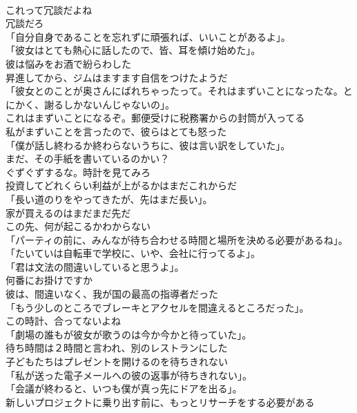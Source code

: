 \documentclass[8pt]{extreport}
\begin{document}
\begin{CJK}{UTF8}{min}
\\	これって冗談だよね 
\\	冗談だろ	
\\	「自分自身であることを忘れずに頑張れば、いいことがあるよ」。	
\\	「彼女はとても熱心に話したので、皆、耳を傾け始めた」。	
\\	彼は悩みをお酒で紛らわした	
\\	昇進してから、ジムはますます自信をつけたようだ	
\\	「彼女とのことが奥さんにばれちゃったって。それはまずいことになったな。とにかく、謝るしかないんじゃないの」。	
\\	これはまずいことになるぞ。郵便受けに税務署からの封筒が入ってる	
\\	私がまずいことを言ったので、彼らはとても怒った	
\\	「僕が話し終わるか終わらないうちに、彼は言い訳をしていた」。	
\\	まだ、その手紙を書いているのかい？	
\\	ぐずぐずするな。時計を見てみろ	
\\	投資してどれくらい利益が上がるかはまだこれからだ	
\\	「長い道のりをやってきたが、先はまだ長い」。	
\\	家が買えるのはまだまだ先だ	
\\	この先、何が起こるかわからない	
\\	「パーティの前に、みんなが待ち合わせる時間と場所を決める必要があるね」。	
\\	「たいていは自転車で学校に、いや、会社に行ってるよ」。	
\\	「君は文法の間違いしていると思うよ」。	
\\	何番にお掛けですか	
\\	彼は、間違いなく、我が国の最高の指導者だった	
\\	「もう少しのところでブレーキとアクセルを間違えるところだった」。	
\\	この時計、合ってないよね	
\\	「劇場の誰もが彼女が歌うのは今か今かと待っていた」。	
\\	待ち時間は２時間と言われ、別のレストランにした	
\\	子どもたちはプレゼントを開けるのを待ちきれない	
\\	「私が送った電子メールへの彼の返事が待ちきれない」。	
\\	「会議が終わると、いつも僕が真っ先にドアを出る」。	
\\	新しいプロジェクトに乗り出す前に、もっとリサーチをする必要がある	

\end{CJK}
\end{document}
